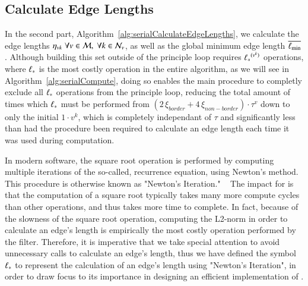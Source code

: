 \subsection{Calculate Edge Lengths}
\label{ch5sSIssCEL}
In the second part, Algorithm~\ref{alg:serialCalculateEdgeLengths}, we calculate the edge lengths $\eta_{vk} \; \forall v \in \mathcal{M}, \; \forall  k \in \mathcal{N}_v$, as well as the global minimum edge length $\overline{\ell_\text{min}}$. Although building this set outside of the principle loop requires ${\ell_\ast}^{(v^k)}$ operations, where $\ell_\ast$ is the most costly operation in the entire algorithm, as we will see in Algorithm~\ref{alg:serialCompute}, doing so enables the main procedure to completly exclude all $\ell_\ast$ operations from the principle loop, reducing the total amount of times which $\ell_\ast$ must be performed from ${(2\,\xi_{border} + 4\,\xi_{non-border})\cdot\tau^v}$ down to only the initial $1\cdot v^k$, which is completely independant of $\tau$ and significantly less than had the procedure been required to calculate an edge length each time it was used during computation.%
%

In modern software, the square root operation is performed by computing multiple iterations of the so-called, recurrence equation, using Newton's method. This procedure is otherwise known as "Newton's Iteration." ~\cite{Weisstein19b} The impact for  is that the computation of a square root typically takes many more compute cycles than other operations, and thus takes more time to complete. In fact, because of the slowness of the square root operation, computing the L2-norm in order to calculate an edge's length is empirically the most costly operation performed by the filter. Therefore, it is imperative that we take special attention to avoid unnecessary calls to calculate an edge's length, thus we have defined the symbol $\ell_\ast$ to represent the calculation of an edge's length using "Newton's Iteration", in order to draw focus to its importance  in designing an efficient implementation of .%

